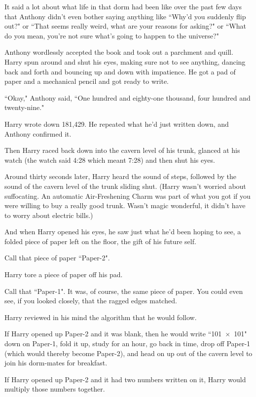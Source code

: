 It said a lot about what life in that dorm had been like over the past few days that Anthony didn't even bother saying anything like ``Why'd you suddenly flip out?" or ``That seems really weird, what are your reasons for asking?" or ``What do you mean, you're not sure what's going to happen to the universe?"

Anthony wordlessly accepted the book and took out a parchment and quill. Harry spun around and shut his eyes, making sure not to see anything, dancing back and forth and bouncing up and down with impatience. He got a pad of paper and a mechanical pencil and got ready to write.

``Okay," Anthony said, ``One hundred and eighty-one thousand, four hundred and twenty-nine."

Harry wrote down 181,429. He repeated what he'd just written down, and Anthony confirmed it.

Then Harry raced back down into the cavern level of his trunk, glanced at his watch (the watch said 4:28 which meant 7:28) and then shut his eyes.

Around thirty seconds later, Harry heard the sound of steps, followed by the sound of the cavern level of the trunk sliding shut. (Harry wasn't worried about suffocating. An automatic Air-Freshening Charm was part of what you got if you were willing to buy a really good trunk. Wasn't magic wonderful, it didn't have to worry about electric bills.)

And when Harry opened his eyes, he saw just what he'd been hoping to see, a folded piece of paper left on the floor, the gift of his future self.

Call that piece of paper ``Paper-2".

Harry tore a piece of paper off his pad.

Call that ``Paper-1". It was, of course, the same piece of paper. You could even see, if you looked closely, that the ragged edges matched.

Harry reviewed in his mind the algorithm that he would follow.

If Harry opened up Paper-2 and it was blank, then he would write ``101~$\times$~101" down on Paper-1, fold it up, study for an hour, go back in time, drop off Paper-1 (which would thereby become Paper-2), and head on up out of the cavern level to join his dorm-mates for breakfast.

If Harry opened up Paper-2 and it had two numbers written on it, Harry would multiply those numbers together.

